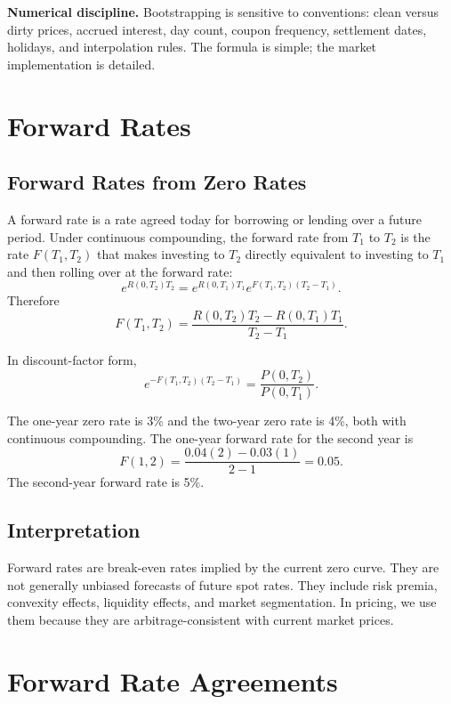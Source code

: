 \begin{boxF}
\textbf{Numerical discipline.} Bootstrapping is sensitive to conventions:
clean versus dirty prices, accrued interest, day count, coupon frequency,
settlement dates, holidays, and interpolation rules. The formula is simple; the
market implementation is detailed.
\end{boxF}

\section{Forward Rates}

\subsection{Forward Rates from Zero Rates}

A forward rate is a rate agreed today for borrowing or lending over a future
period. Under continuous compounding, the forward rate from $T_1$ to $T_2$ is
the rate $F(T_1,T_2)$ that makes investing to $T_2$ directly equivalent to
investing to $T_1$ and then rolling over at the forward rate:
\[
    e^{R(0,T_2)T_2}
    =
    e^{R(0,T_1)T_1}e^{F(T_1,T_2)(T_2-T_1)}.
\]
Therefore
\[
    F(T_1,T_2)
    =
    \frac{R(0,T_2)T_2-R(0,T_1)T_1}{T_2-T_1}.
\]

In discount-factor form,
\[
    e^{-F(T_1,T_2)(T_2-T_1)}
    =
    \frac{P(0,T_2)}{P(0,T_1)}.
\]

\begin{exmp}
The one-year zero rate is 3\% and the two-year zero rate is 4\%, both with
continuous compounding. The one-year forward rate for the second year is
\[
    F(1,2)=\frac{0.04(2)-0.03(1)}{2-1}=0.05.
\]
The second-year forward rate is 5\%.
\end{exmp}

\subsection{Interpretation}

Forward rates are break-even rates implied by the current zero curve. They are
not generally unbiased forecasts of future spot rates. They include risk
premia, convexity effects, liquidity effects, and market segmentation. In
pricing, we use them because they are arbitrage-consistent with current market
prices.

\section{Forward Rate Agreements}

